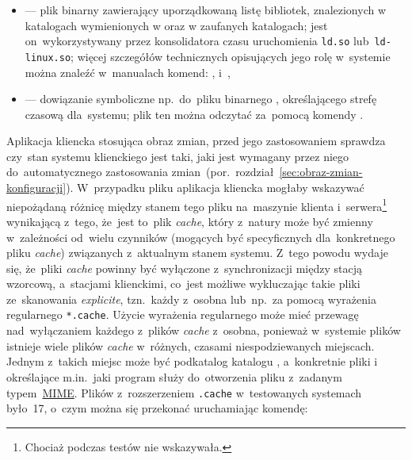 \documentclass[thesis]{subfiles}
\begin{document}
\begin{itemize}
	\item \href{https://linux.die.net/man/8/ldconfig}{} --- plik binarny zawierający uporządkowaną listę bibliotek, znalezionych w katalogach wymienionych w  oraz w zaufanych katalogach; jest on~wykorzystywany przez konsolidatora czasu uruchomienia \texttt{ld.so} lub~\texttt{ld-linux.so}; więcej szczegółów technicznych opisujących jego rolę w~systemie można znaleźć w~manualach komend: ,  i~,
	\item {} --- dowiązanie symboliczne np.~do~pliku binarnego , określającego strefę czasową dla~systemu; plik ten można odczytać za~pomocą komendy .
\end{itemize}

Aplikacja kliencka stosująca obraz zmian, przed jego zastosowaniem sprawdza czy~stan systemu klienckiego jest taki, jaki jest wymagany przez niego do~automatycznego zastosowania zmian~(por.~rozdział~\ref{sec:obraz-zmian-konfiguracji}). W~przypadku pliku  aplikacja kliencka mogłaby wskazywać niepożądaną różnicę między stanem tego pliku na~maszynie klienta i~serwera\footnote{Chociaż podczas testów nie wskazywała.} wynikającą z~tego, że~jest to~plik \emph{cache}, który z~natury może być zmienny w~zależności od~wielu czynników (mogących być specyficznych dla~konkretnego pliku \emph{cache}) związanych z~aktualnym stanem systemu. Z~tego powodu wydaje się, że~pliki \emph{cache} powinny być wyłączone z~synchronizacji między stacją wzorcową, a~stacjami klienckimi, co~jest możliwe wykluczając takie pliki ze~skanowania \emph{explicite}, tzn.~każdy z~osobna lub~np.~za pomocą wyrażenia regularnego \texttt{*.cache}. Użycie wyrażenia regularnego może mieć przewagę nad~wyłączaniem każdego z~plików \emph{cache} z~osobna, ponieważ w~systemie plików istnieje wiele plików \emph{cache} w~różnych, czasami niespodziewanych miejscach. Jednym z~takich miejsc może być podkatalog katalogu , a~konkretnie pliki  i~ określające m.in.~jaki program służy do~otworzenia pliku z~zadanym typem~\href{https://en.wikipedia.org/wiki/Media_type}{MIME}. Plików z~rozszerzeniem \texttt{.cache} w~testowanych systemach było~17, o~czym można się przekonać uruchamiając komendę:
\end{document}
